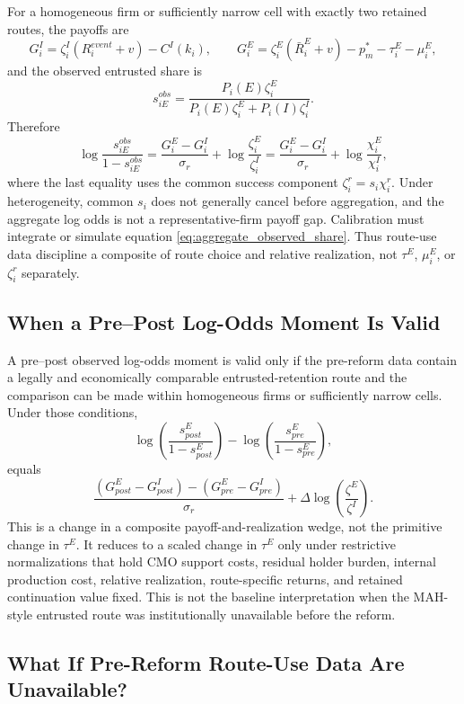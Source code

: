 \documentclass[12pt]{article}
\newcommand{\1}{\mathbf{1}}
\begin{document}
For a homogeneous firm or sufficiently narrow cell with exactly two retained routes, the payoffs are
\[
    G_i^I=\zeta_i^I(R_i^{event}+v)-C^I(k_i),
    \qquad
    G_i^E=\zeta_i^E(\bar R_i^E+v)-p_m^*-\tau_i^E-\mu_i^E,
\]
and the observed entrusted share is
\[
    s_{iE}^{obs}
    =\frac{P_i(E)\zeta_i^E}
    {P_i(E)\zeta_i^E+P_i(I)\zeta_i^I}.
\]
Therefore
\begin{equation}
    \log\frac{s_{iE}^{obs}}{1-s_{iE}^{obs}}
    =\frac{G_i^E-G_i^I}{\sigma_r}
     +\log\frac{\zeta_i^E}{\zeta_i^I}
    =\frac{G_i^E-G_i^I}{\sigma_r}
     +\log\frac{\chi_i^E}{\chi_i^I},
    \label{eq:detailed_observed_logodds}
\end{equation}
where the last equality uses the common success component $\zeta_i^r=s_i\chi_i^r$. Under heterogeneity, common $s_i$ does not generally cancel before aggregation, and the aggregate log odds is not a representative-firm payoff gap. Calibration must integrate or simulate equation \eqref{eq:aggregate_observed_share}. Thus route-use data discipline a composite of route choice and relative realization, not $\tau^E$, $\mu_i^E$, or $\zeta_i^r$ separately.

\subsection{When a Pre--Post Log-Odds Moment Is Valid}

A pre--post observed log-odds moment is valid only if the pre-reform data contain a legally and economically comparable entrusted-retention route and the comparison can be made within homogeneous firms or sufficiently narrow cells. Under those conditions,
\[
    \log\left(\frac{s_{post}^E}{1-s_{post}^E}\right)
    -
    \log\left(\frac{s_{pre}^E}{1-s_{pre}^E}\right),
\]
equals
\[
    \frac{(G_{post}^E-G_{post}^I)-(G_{pre}^E-G_{pre}^I)}{\sigma_r}
    +\Delta\log\left(\frac{\zeta^E}{\zeta^I}\right).
\]
This is a change in a composite payoff-and-realization wedge, not the primitive change in $\tau^E$. It reduces to a scaled change in $\tau^E$ only under restrictive normalizations that hold CMO support costs, residual holder burden, internal production cost, relative realization, route-specific returns, and retained continuation value fixed. This is not the baseline interpretation when the MAH-style entrusted route was institutionally unavailable before the reform.

\subsection{What If Pre-Reform Route-Use Data Are Unavailable?}
\end{document}
